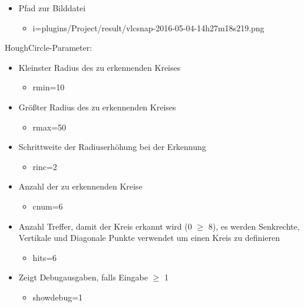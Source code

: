 \begin{itemize}
	\item Pfad zur Bilddatei
	\begin{itemize}
		\item i=plugins/Project/result/vlcsnap-2016-05-04-14h27m18s219.png
	\end{itemize}
	\end{itemize}
HoughCircle-Parameter:
\begin{itemize}
	\item Kleinster Radius des zu erkennenden Kreises
	\begin{itemize}
		 \item rmin=10
	\end{itemize}
	\item Größter Radius des zu erkennenden Kreises
	\begin{itemize}
		\item rmax=50
	\end{itemize}
	\item Schrittweite der Radiuserhöhung bei der Erkennung
	\begin{itemize}
		\item rinc=2
	\end{itemize}
	\item Anzahl der zu erkennenden Kreise
	\begin{itemize}
		\item cnum=6
	\end{itemize}
	\item Anzahl Treffer, damit der Kreis erkannt wird (0 $\ge$ 8), es werden Senkrechte, Vertikale und Diagonale Punkte verwendet um einen Kreis zu definieren
	\begin{itemize}
		\item hits=6
	\end{itemize}
	\item Zeigt Debugausgaben, falls Eingabe $\ge$ 1
	\begin{itemize}
		\item showdebug=1
	\end{itemize}
\end{itemize}
